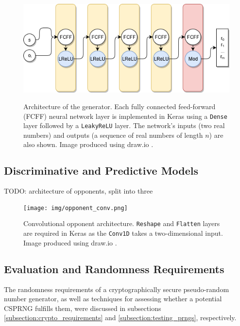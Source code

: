 \documentclass[12pt, titlepage]{report}
\theoremstyle{definition}
\begin{document}
\begin{figure}
\centering
\includegraphics[width=1\textwidth]{img/generator.png}\\
\caption{Architecture of the generator. Each fully connected feed-forward (FCFF) neural network layer is implemented in Keras using a \texttt{Dense} layer followed by a \texttt{LeakyReLU} layer. The network's inputs (two real numbers) and outputs (a sequence of real numbers of length $n$) are also shown. Image produced using draw.io \cite{jgraph2018draw}.}
\label{figure:architecture_generator}
\end{figure}

\subsection{Discriminative and Predictive Models}
TODO: architecture of opponents, split into three

\begin{figure}
\centering
\texttt{[image: img/opponent\_conv.png]}\\
\caption{Convolutional opponent architecture. \texttt{Reshape} and \texttt{Flatten} layers are required in Keras as the \texttt{Conv1D} takes a two-dimensional input. Image produced using draw.io \cite{jgraph2018draw}.}
\label{figure:architecture_conv}
\end{figure}




\subsection{Evaluation and Randomness Requirements}\label{subsection:eval_and_randomness}
The randomness requirements of a cryptographically secure pseudo-random number generator, as well as techniques for assessing whether a potential CSPRNG fulfills them, were discussed in subsections \ref{subsection:crypto_requirements} and \ref{subsection:testing_prngs}, respectively.
\end{document}
